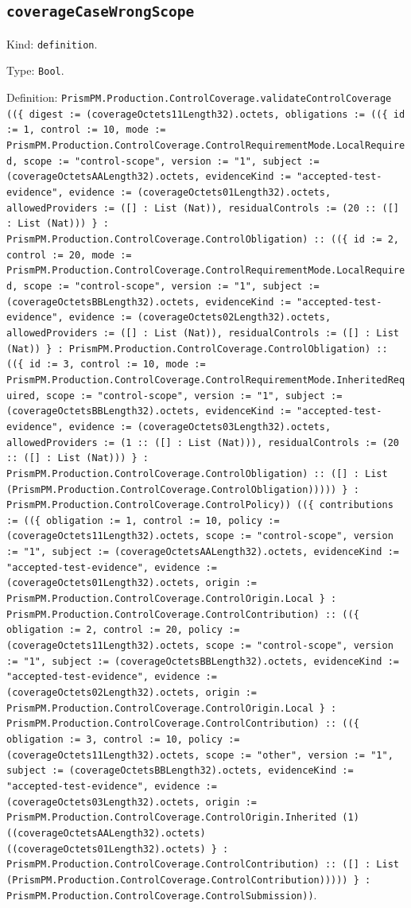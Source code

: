 \documentclass[11pt]{article}
\begin{document}
\subsection*{\texttt{coverageCaseWrongScope}}
\noindent Kind: \texttt{definition}.\par
\noindent Type: \texttt{Bool}.\par
\noindent Definition: \texttt{PrismPM.Production.ControlCoverage.validateControlCoverage ((\{ digest := (coverageOctets11Length32).octets, obligations := ((\{ id := 1, control := 10, mode := PrismPM.Production.ControlCoverage.ControlRequirementMode.LocalRequired, scope := "control-scope", version := "1", subject := (coverageOctetsAALength32).octets, evidenceKind := "accepted-test-evidence", evidence := (coverageOctets01Length32).octets, allowedProviders := ([] : List (Nat)), residualControls := (20 :: ([] : List (Nat))) \} : PrismPM.Production.ControlCoverage.ControlObligation) :: ((\{ id := 2, control := 20, mode := PrismPM.Production.ControlCoverage.ControlRequirementMode.LocalRequired, scope := "control-scope", version := "1", subject := (coverageOctetsBBLength32).octets, evidenceKind := "accepted-test-evidence", evidence := (coverageOctets02Length32).octets, allowedProviders := ([] : List (Nat)), residualControls := ([] : List (Nat)) \} : PrismPM.Production.ControlCoverage.ControlObligation) :: ((\{ id := 3, control := 10, mode := PrismPM.Production.ControlCoverage.ControlRequirementMode.InheritedRequired, scope := "control-scope", version := "1", subject := (coverageOctetsBBLength32).octets, evidenceKind := "accepted-test-evidence", evidence := (coverageOctets03Length32).octets, allowedProviders := (1 :: ([] : List (Nat))), residualControls := (20 :: ([] : List (Nat))) \} : PrismPM.Production.ControlCoverage.ControlObligation) :: ([] : List (PrismPM.Production.ControlCoverage.ControlObligation))))) \} : PrismPM.Production.ControlCoverage.ControlPolicy)) ((\{ contributions := ((\{ obligation := 1, control := 10, policy := (coverageOctets11Length32).octets, scope := "control-scope", version := "1", subject := (coverageOctetsAALength32).octets, evidenceKind := "accepted-test-evidence", evidence := (coverageOctets01Length32).octets, origin := PrismPM.Production.ControlCoverage.ControlOrigin.Local \} : PrismPM.Production.ControlCoverage.ControlContribution) :: ((\{ obligation := 2, control := 20, policy := (coverageOctets11Length32).octets, scope := "control-scope", version := "1", subject := (coverageOctetsBBLength32).octets, evidenceKind := "accepted-test-evidence", evidence := (coverageOctets02Length32).octets, origin := PrismPM.Production.ControlCoverage.ControlOrigin.Local \} : PrismPM.Production.ControlCoverage.ControlContribution) :: ((\{ obligation := 3, control := 10, policy := (coverageOctets11Length32).octets, scope := "other", version := "1", subject := (coverageOctetsBBLength32).octets, evidenceKind := "accepted-test-evidence", evidence := (coverageOctets03Length32).octets, origin := PrismPM.Production.ControlCoverage.ControlOrigin.Inherited (1) ((coverageOctetsAALength32).octets) ((coverageOctets01Length32).octets) \} : PrismPM.Production.ControlCoverage.ControlContribution) :: ([] : List (PrismPM.Production.ControlCoverage.ControlContribution))))) \} : PrismPM.Production.ControlCoverage.ControlSubmission))}.\par
\end{document}
